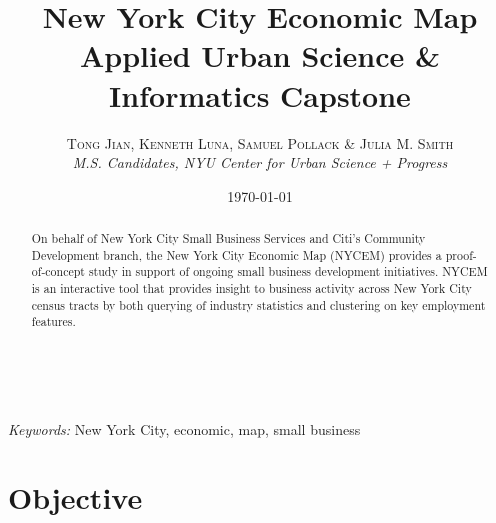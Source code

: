 \documentclass[article, 11pt]{article} %
\title{\textbf{New York City Economic Map}\\ %
Applied Urban Science \& Informatics Capstone} %
\author{\textsc{Tong Jian, Kenneth Luna, Samuel Pollack \& Julia M. Smith} %
\\{\textit{M.S. Candidates, NYU Center for Urban Science + Progress}}} %
\date{\today} %
\makeatletter
\renewcommand{\maketitle}{ %
\begin{flushright} %
{\LARGE\@title} %

\vspace{50pt} %

{\large\@author} %
\\\@date %

\vspace{40pt} %
\end{flushright}
}
\makeatother
\begin{document}
\maketitle %



\begin{abstract}
On behalf of New York City Small Business Services and Citi's Community Development branch, the New York City Economic Map (NYCEM) provides a proof-of-concept study in support of ongoing small business development initiatives. 
NYCEM is an interactive tool that provides insight to business activity across New York City census tracts by both querying of industry statistics and clustering on key employment features.
\end{abstract}

\hspace*{3,6mm}\textit{Keywords:} New York City, economic, map, small business%

\vspace{30pt} %


\section*{Objective}
\end{document}

